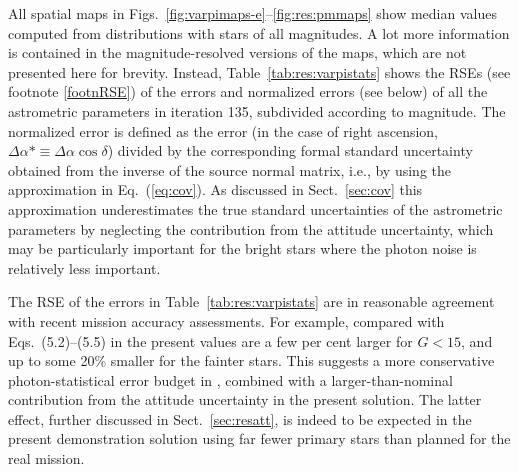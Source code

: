 \documentclass[structabstract]{aa}
\begin{document}
All spatial maps in Figs.~\ref{fig:varpimaps-e}--\ref{fig:res:pmmaps}
show median values computed from distributions with stars of all
magnitudes. A lot more information is contained in the magnitude-resolved
versions of the maps, which are not presented here for brevity.
Instead, Table~\ref{tab:res:varpistats} shows the RSEs 
(see footnote \ref{footnRSE}) of the errors and normalized errors (see below)
of all the astrometric parameters in iteration 135, subdivided according to 
magnitude. The normalized error is defined as the error (in the case of
right ascension, $\Delta\alpha * \equiv\Delta\alpha\cos\delta$) divided 
by the corresponding formal standard uncertainty obtained from the inverse of
the source normal matrix, i.e., by using the approximation in 
Eq.~(\ref{eq:cov}). As discussed in Sect.~\ref{sec:cov} this approximation
underestimates the true standard uncertainties of the astrometric parameters
by neglecting the contribution from the attitude uncertainty, which may 
be particularly important for the bright stars where the photon noise 
is relatively less important.
  
The RSE of the errors in Table~\ref{tab:res:varpistats}
are in reasonable agreement with recent mission accuracy assessments.
For example, compared with Eqs.~(5.2)--(5.5) in \citet{iaus261:LL} the 
present values are a few per cent larger for $G<15$, and up to some 20\%
smaller for the fainter stars. This suggests a more conservative photon-statistical
error budget in \citet{iaus261:LL}, combined with a larger-than-nominal contribution
from the attitude uncertainty in the present solution. The latter effect, further 
discussed in Sect.~\ref{sec:resatt}, is indeed to be expected in the present 
demonstration solution using far fewer primary stars than planned for the real mission.
\end{document}
